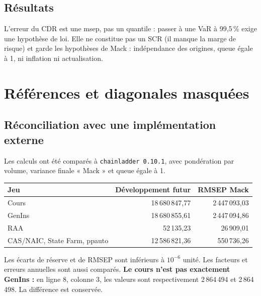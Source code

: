 \documentclass[11pt,a4paper]{article}
\begin{document}
\subsection*{Résultats}
\begin{table}[H]\centering\small
\tabMWCourse
\caption{Triangle du cours : erreur de Mack sur l'ultime et erreur du CDR à un an, par origine (racines des msep).}
\end{table}
\begin{table}[H]\centering\small
\tabMWDatasets
\caption{Tous les triangles du projet. La part révélée en un an est élevée quand le développement est rapide.}
\end{table}
\begin{limitbox}
L'erreur du CDR est une msep, pas un quantile : passer à une VaR à 99,5\,\% exige une hypothèse de loi. Elle ne constitue pas un SCR (il manque la marge de risque) et garde les hypothèses de Mack : indépendance des origines, queue égale à 1, ni inflation ni actualisation.
\end{limitbox}

\newpage
\section{Références et diagonales masquées}
\subsection*{Réconciliation avec une implémentation externe}
Les calculs ont été comparés à \texttt{chainladder 0.10.1}, avec pondération par volume, variance finale « Mack » et queue égale à 1.

\begin{center}
\small
\begin{tabularx}{\linewidth}{Xrr}
\toprule
Jeu & Développement futur & RMSEP Mack \\
\midrule
Cours & 18\,680\,847,77 & 2\,447\,093,03 \\
GenIns & 18\,680\,855,61 & 2\,447\,094,86 \\
RAA & 52\,135,23 & 26\,909,01 \\
CAS/NAIC, State Farm, ppauto & 12\,586\,821,36 & 550\,736,26 \\
\bottomrule
\end{tabularx}
\end{center}
Les écarts de réserve et de RMSEP sont inférieurs à $10^{-6}$ unité. Les facteurs et erreurs annuelles sont aussi comparés. \textbf{Le cours n'est pas exactement GenIns :} en ligne 8, colonne 3, les valeurs sont respectivement 2\,864\,494 et 2\,864\,498. La différence est conservée.
\end{document}
